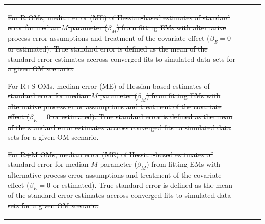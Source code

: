 \documentclass[
  12pt,
]{article}
\makeatletter
\providecommand{\DIFdel}[1]{{\protect\color{red}\sout{#1}}} %
\providecommand{\DIFdelFL}[1]{\DIFdel{#1}} %
\let\sout@orig\sout %
\renewcommand{\sout}[1]{\ifmmode\text{\sout@orig{\ensuremath{#1}}}\else\sout@orig{#1}\fi} %
\makeatother
\begin{document}
\begin{table}
{\begin{center}
\begin{tabular}{lrrr}
{%
\DIFdelFL{For R OMs, median error (ME) of Hessian-based estimates of standard error for median $M$ parameter ($\beta_M$) from fitting EMs with alternative process error assumptions and treatment of the covariate effect ($\beta_ E= 0$ or estimated). True standard error is defined as the mean of the standard error estimates accross converged fits to simulated data sets for a given OM scenario.}}%

{%
\DIFdelFL{For R+S OMs, median error (ME) of Hessian-based estimates of standard error for median $M$ parameter ($\beta_M$) from fitting EMs with alternative process error assumptions and treatment of the covariate effect ($\beta_ E= 0$ or estimated). True standard error is defined as the mean of the standard error estimates accross converged fits to simulated data sets for a given OM scenario.}}%

{%
\DIFdelFL{For R+M OMs, median error (ME) of Hessian-based estimates of standard error for median $M$ parameter ($\beta_M$) from fitting EMs with alternative process error assumptions and treatment of the covariate effect ($\beta_ E= 0$ or estimated). True standard error is defined as the mean of the standard error estimates accross converged fits to simulated data sets for a given OM scenario.}}%


\end{tabular}
\end{center}}
\end{table}
\end{document}
